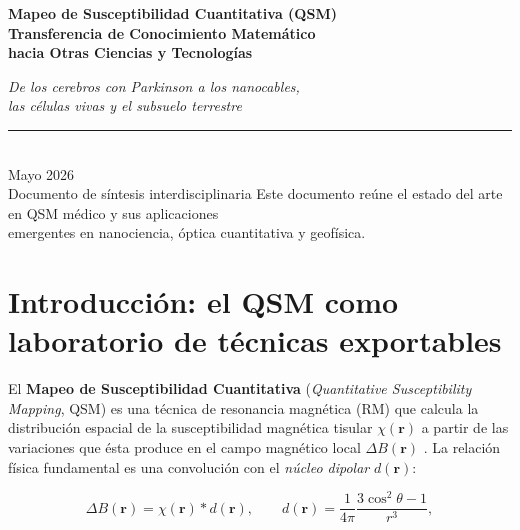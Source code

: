 \documentclass[12pt, a4paper]{article}
\begin{document}
\begin{titlepage}
  \centering
  \vspace*{2cm}
  {\Huge\bfseries Mapeo de Susceptibilidad Cuantitativa (QSM)\\[0.5em]
   \large Transferencia de Conocimiento Matemático\\
   hacia Otras Ciencias y Tecnologías\par}
  \vspace{1.5cm}
  {\large\itshape De los cerebros con Parkinson a los nanocables,\\
   las células vivas y el subsuelo terrestre\par}
  \vspace{2cm}
  \rule{0.6\textwidth}{0.4pt}\\[0.8cm]
  {\normalsize Mayo 2026\\[0.3em]
   Documento de síntesis interdisciplinaria}
  \vfill
  {\small Este documento reúne el estado del arte en QSM médico y sus aplicaciones\\
   emergentes en nanociencia, óptica cuantitativa y geofísica.}
\end{titlepage}

\tableofcontents
\clearpage

\section{Introducción: el QSM como laboratorio de técnicas exportables}

El \textbf{Mapeo de Susceptibilidad Cuantitativa} (\emph{Quantitative Susceptibility Mapping}, QSM) es una técnica de resonancia magnética (RM) que calcula la distribución espacial de la susceptibilidad magnética tisular $\chi(\mathbf{r})$ a partir de las variaciones que ésta produce en el campo magnético local $\Delta B(\mathbf{r})$ \cite{Wang2015QSM, Deistung2017Review}. La relación física fundamental es una convolución con el \emph{núcleo dipolar} $d(\mathbf{r})$:

\begin{equation}
  \Delta B(\mathbf{r}) = \chi(\mathbf{r}) * d(\mathbf{r}),
  \qquad
  d(\mathbf{r}) = \frac{1}{4\pi}\frac{3\cos^2\theta - 1}{r^3},
  \label{eq:convolucion}
\end{equation}
\end{document}
